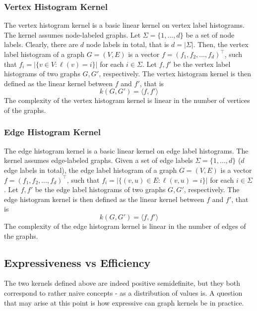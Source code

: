 \documentclass[twoside,11pt]{article}
\begin{document}
\subsubsection{Vertex Histogram Kernel}
The vertex histogram kernel is a basic linear kernel on vertex label histograms.
The kernel assumes node-labeled graphs.
Let $\Sigma=\{1,\ldots,d\}$ be a set of node labels.
Clearly, there are $d$ node labels in total, that is $d = |\Sigma|$.
Then, the vertex label histogram of a graph $G=(V,E)$ is a vector $f = (f_1, f_2, \ldots, f_d)^\top$, such that $f_i = |\{ v \in V : \ell(v) = i \}|$ for each $i \in \Sigma$.
Let $f, f'$ be the vertex label histograms of two graphs $G, G'$, respectively.
The vertex histogram kernel is then defined as the linear kernel between $f$ and $f'$, that is
\begin{equation}
    k(G, G') = \langle f, f' \rangle
\end{equation}
The complexity of the vertex histogram kernel is linear in the number of vertices of the graphs.

\subsubsection{Edge Histogram Kernel}
The edge histogram kernel is a basic linear kernel on edge label histograms.
The kernel assumes edge-labeled graphs.
Given a set of edge labels $\Sigma=\{1,\ldots,d\}$ ($d$ edge labels in total), the edge label histogram of a graph $G=(V,E)$ is a vector $f = (f_1, f_2, \ldots, f_d)^\top$, such that $f_i = |\{ (v,u) \in E : \ell(v,u) = i \}|$ for each $i \in \Sigma$.
Let $f, f'$ be the edge label histograms of two graphs $G, G'$, respectively.
The edge histogram kernel is then defined as the linear kernel between $f$ and $f'$, that is
\begin{equation}
    k(G, G') = \langle f, f' \rangle
\end{equation}
The complexity of the edge histogram kernel is linear in the number of edges of the graphs.

\subsection{Expressiveness vs Efficiency}
The two kernels defined above are indeed positive semidefinite, but they both correspond to rather naive concepts - as a distribution of values is.
A question that may arise at this point is how expressive can graph kernels be in practice.
\end{document}
